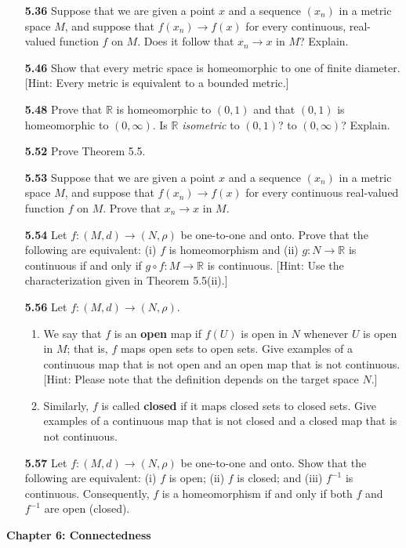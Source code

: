 \documentclass[12pt]{amsart}
\def\iff{if and only if }
\def\RR{{\mathbb R}}
\newcommand{\inv}[1]{#1^{-1}}
\begin{document}
\begin{enumerate}
\item[\bf 5.36] Suppose that we are given a point $x$ and a sequence $(x_n)$ in a metric space $M$, and suppose that $f(x_n)\to f(x)$ for every continuous, real-valued function $f$ on $M$. Does it follow that $x_n\to x$ in $M$? Explain.

\bigskip

\item[\bf 5.46] Show that every metric space is homeomorphic to one of finite diameter. [Hint: Every metric is equivalent to a bounded metric.]

\bigskip

\item[\bf 5.48] Prove that $\RR$ is homeomorphic to $(0,1)$ and that $(0,1)$ is homeomorphic to $(0,\infty)$. Is $\RR$ \textit{isometric} to $(0,1)$? to $(0,\infty)$? Explain.

\bigskip

\item[\bf 5.52] Prove Theorem 5.5.

\bigskip

\item[\bf 5.53] Suppose that we are given a point $x$ and a sequence $(x_n)$ in a metric space $M$, and suppose that $f(x_n)\to f(x)$ for every continuous real-valued function $f$ on $M$. Prove that $x_n\to x$ in $M$.

\bigskip

\item[\bf 5.54] Let $f:(M,d)\to (N,\rho)$ be one-to-one and onto. Prove that the following are equivalent: (i) $f$ is homeomorphism and (ii) $g : N\to \RR$ is continuous \iff $g\circ f:M\to\RR$ is continuous. [Hint: Use the characterization given in Theorem 5.5(ii).]

\bigskip

\item[\bf 5.56] Let $f:(M,d)\to(N,\rho)$. 
	\begin{enumerate}[label={\bf (\roman*)}]
	\item We say that $f$ is an {\bf open} map if $f(U)$ is open in $N$ whenever $U$ is open in $M$; that is, $f$ maps open sets to open sets. Give examples of a continuous map that is not open and an open map that is not continuous. [Hint: Please note that the definition depends on the target space $N$.]
	\medskip
	\item Similarly, $f$ is called {\bf closed} if it maps closed sets to closed sets. Give examples of a continuous map that is not closed and a closed map that is not continuous. 
	\end{enumerate}


\bigskip

\item[\bf 5.57] Let $f:(M,d)\to(N,\rho)$ be one-to-one and onto. Show that the following are equivalent: (i) $f$ is open; (ii) $f$ is closed; and (iii) $\inv f$ is continuous. Consequently, $f$ is a homeomorphism \iff both $f$ and $\inv f$ are open (closed). 

\bigskip

\end{enumerate}
{\bf Chapter 6: Connectedness}
\end{document}
